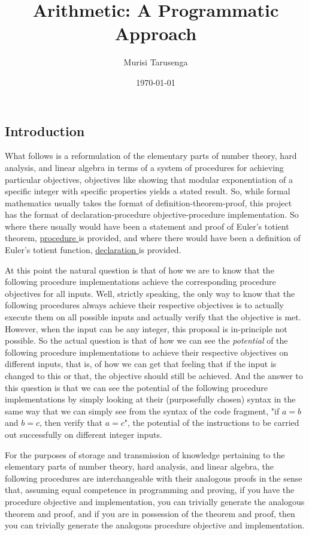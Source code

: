 \documentclass{article}
\newcounter{declaration}[part]
\newcommand{\declarationhr}[1]{\hyperref[sec:declaration #1]{declaration \expandafter\csname declaration#1\endcsname}}
\newcounter{procedure}[part]
\newcommand{\procedurehr}[1]{\hyperref[sec:procedure #1]{procedure \expandafter\csname procedure#1\endcsname}}
\begin{document}
	\title{Arithmetic: A Programmatic Approach}
	\author{Murisi Tarusenga}
	\date{\today{} \currenttime}
	\maketitle
	\begin{multicols}{2}
		\section*{Introduction}
			What follows is a reformulation of the elementary parts of number theory, hard analysis, and linear algebra in terms of a system of procedures for achieving particular objectives, objectives like showing that modular exponentiation of a specific integer with specific properties yields a stated result. So, while formal mathematics usually takes the format of definition-theorem-proof, this project has the format of declaration-procedure objective-procedure implementation. So where there usually would have been a statement and proof of Euler's totient theorem, \procedurehr{1.50} is provided, and where there would have been a definition of Euler's totient function, \declarationhr{1.16} is provided.
		
			At this point the natural question is that of how we are to know that the following procedure implementations achieve the corresponding procedure objectives for all inputs. Well, strictly speaking, the only way to know that the following procedures always achieve their respective objectives is to actually execute them on all possible inputs and actually verify that the objective is met. However, when the input can be any integer, this proposal is in-principle not possible. So the actual question is that of how we can see the \textit{potential} of the following procedure implementations to achieve their respective objectives on different inputs, that is, of how we can get that feeling that if the input is changed to this or that, the objective should still be achieved. And the answer to this question is that we can see the potential of the following procedure implementations by simply looking at their (purposefully chosen) syntax in the same way that we can simply see from the syntax of the code fragment, "if $a=b$ and $b=c$, then verify that $a=c$", the potential of the instructions to be carried out successfully on different integer inputs.
		
			For the purposes of storage and transmission of knowledge pertaining to the elementary parts of number theory, hard analysis, and linear algebra, the following procedures are interchangeable with their analogous proofs in the sense that, assuming equal competence in programming and proving, if you have the procedure objective and implementation, you can trivially generate the analogous theorem and proof, and if you are in possession of the theorem and proof, then you can trivially generate the analogous procedure objective and implementation.
		\tableofcontents
		\printnoidxglossary[title={Declarations},sort=def]
	\end{multicols}
	\clearpage
\end{document}
